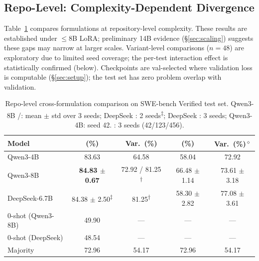 \subsection{Repo-Level: Complexity-Dependent Divergence}
\label{sec:repo}

Table~\ref{tab:repo_level} compares formulations at repository-level complexity. These results are established under ${\leq}$8B LoRA; preliminary 14B evidence (\S\ref{sec:scaling}) suggests these gaps may narrow at larger scales. Variant-level comparisons ($n{=}48$) are exploratory due to limited seed coverage; the per-test interaction effect is statistically confirmed (below). Checkpoints are val-selected where validation loss is computable (\S\ref{sec:setup}); the test set has zero problem overlap with validation.

\begin{table}[t]
\centering
\small
\caption{Repo-level cross-formulation comparison on SWE-bench Verified test set. Qwen3-8B \cls{}/\traj{}: mean $\pm$ std over 3 seeds; DeepSeek \cls{}: 2 seeds\textsuperscript{$\ddagger$}; DeepSeek \traj{}: 3 seeds; Qwen3-4B: seed 42. \cwm{}: 3 seeds (42/123/456).}
\label{tab:repo_level}
\setlength{\tabcolsep}{5pt}
\renewcommand{\arraystretch}{1.0}
\begin{tabular}{lcccc}
\toprule
\textbf{Model} & \textbf{\cls{} (\%)} & \textbf{\cls{} Var.\ (\%)} & \textbf{\cwm{} (\%)} & \textbf{\traj{} Var.\ (\%)\textsuperscript{$\diamond$}} \\
\midrule
Qwen3-4B & 83.63 & 64.58 & 58.04 & 72.92 \\
Qwen3-8B & \textbf{84.83 $\pm$ 0.67} & 72.92 / 81.25\textsuperscript{$\dagger$} & 66.48 $\pm$ 1.14 & 73.61 $\pm$ 3.18 \\
DeepSeek-6.7B & 84.38 $\pm$ 2.50\textsuperscript{$\ddagger$} & 81.25\textsuperscript{$\dagger$} & 58.30 $\pm$ 2.82 & 77.08 $\pm$ 3.61 \\
\midrule
0-shot (Qwen3-8B) & 49.90 & --- & --- & --- \\
0-shot (DeepSeek) & 48.54 & --- & --- & --- \\
Majority & 72.96 & 54.17 & 72.96 & 54.17 \\
\bottomrule
\end{tabular}


\end{table}
